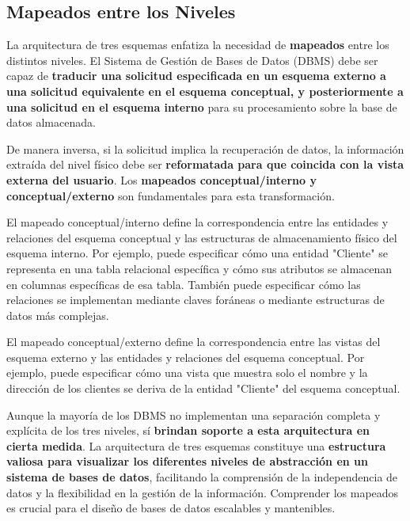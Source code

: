 \subsection{Mapeados entre los Niveles}

La arquitectura de tres esquemas enfatiza la necesidad de \textbf{mapeados} entre los distintos niveles.  El Sistema de Gestión de Bases de Datos (DBMS) debe ser capaz de \textbf{traducir una solicitud especificada en un esquema externo a una solicitud equivalente en el esquema conceptual, y posteriormente a una solicitud en el esquema interno} para su procesamiento sobre la base de datos almacenada.

De manera inversa, si la solicitud implica la recuperación de datos, la información extraída del nivel físico debe ser \textbf{reformatada para que coincida con la vista externa del usuario}. Los \textbf{mapeados conceptual/interno y conceptual/externo} son fundamentales para esta transformación.

El mapeado conceptual/interno define la correspondencia entre las entidades y relaciones del esquema conceptual y las estructuras de almacenamiento físico del esquema interno.  Por ejemplo, puede especificar cómo una entidad "Cliente" se representa en una tabla relacional específica y cómo sus atributos se almacenan en columnas específicas de esa tabla. También puede especificar cómo las relaciones se implementan mediante claves foráneas o mediante estructuras de datos más complejas.

El mapeado conceptual/externo define la correspondencia entre las vistas del esquema externo y las entidades y relaciones del esquema conceptual.  Por ejemplo, puede especificar cómo una vista que muestra solo el nombre y la dirección de los clientes se deriva de la entidad "Cliente" del esquema conceptual.

Aunque la mayoría de los DBMS no implementan una separación completa y explícita de los tres niveles, sí \textbf{brindan soporte a esta arquitectura en cierta medida}. La arquitectura de tres esquemas constituye una \textbf{estructura valiosa para visualizar los diferentes niveles de abstracción en un sistema de bases de datos}, facilitando la comprensión de la independencia de datos y la flexibilidad en la gestión de la información.  Comprender los mapeados es crucial para el diseño de bases de datos escalables y mantenibles.
